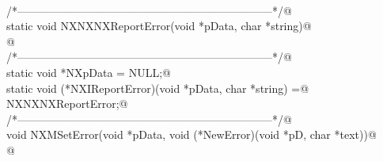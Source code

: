 \documentclass[12pt]{article}
\begin{document}
\begin{flushleft} \small
\begin{minipage}{\linewidth} \label{scrap28}
\vspace{-1ex}
\begin{list}{}{} \item
\mbox{}\verb@@\\
\mbox{}\verb@/*---------------------------------------------------------------------*/@\\
\mbox{}\verb@   static void NXNXNXReportError(void *pData, char *string)@\\
\mbox{}@\\
\mbox{}\verb@/*---------------------------------------------------------------------*/@\\
\mbox{}\verb@   static void *NXpData = NULL;@\\
\mbox{}\verb@   static void (*NXIReportError)(void *pData, char *string) =@\\
\mbox{}\verb@                NXNXNXReportError;@\\
\mbox{}\verb@/*---------------------------------------------------------------------*/@\\
\mbox{}\verb@   void NXMSetError(void *pData, void (*NewError)(void *pD, char *text))@\\
\mbox{}@\\
\end{list}
\vspace{-1ex}
\footnotesize\addtolength{\baselineskip}{-1ex}
\end{minipage}\\[4ex]
\end{flushleft}
\end{document}
